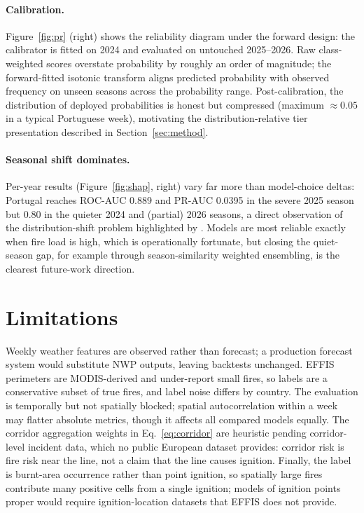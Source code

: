 \documentclass[11pt]{article}
\begin{document}
\paragraph{Calibration.} Figure~\ref{fig:pr} (right) shows the reliability
diagram under the forward design: the calibrator is fitted on 2024 and
evaluated on untouched 2025--2026. Raw class-weighted scores overstate
probability by roughly an order of magnitude; the forward-fitted isotonic
transform aligns predicted probability with observed frequency on unseen
seasons across the probability range. Post-calibration, the
distribution of deployed probabilities is honest but compressed (maximum
$\approx 0.05$ in a typical Portuguese week), motivating the
distribution-relative tier presentation described in
Section~\ref{sec:method}.

\paragraph{Seasonal shift dominates.} Per-year results
(Figure~\ref{fig:shap}, right) vary far more than model-choice deltas:
Portugal reaches ROC-AUC 0.889 and PR-AUC 0.0395 in the severe 2025 season
but 0.80 in the quieter 2024 and (partial) 2026 seasons, a direct
observation of the distribution-shift problem highlighted by
\citet{jiang2026eapo}. Models are most reliable exactly when fire load is
high, which is operationally fortunate, but closing the quiet-season gap,
for example through season-similarity weighted ensembling, is the clearest
future-work direction.

\section{Limitations}
\label{sec:limitations}

Weekly weather features are observed rather than forecast; a production
forecast system would substitute NWP outputs, leaving backtests unchanged.
EFFIS perimeters are MODIS-derived and under-report small fires, so labels
are a conservative subset of true fires, and label noise differs by
country. The evaluation is temporally but not spatially blocked; spatial
autocorrelation within a week may flatter absolute metrics, though it
affects all compared models equally. The corridor aggregation weights in
Eq.~\ref{eq:corridor} are heuristic pending corridor-level incident data,
which no public European dataset provides: corridor risk is fire risk near
the line, not a claim that the line causes ignition. Finally, the label is
burnt-area occurrence rather than point ignition, so spatially large fires
contribute many positive cells from a single ignition; models of ignition
points proper would require ignition-location datasets that EFFIS does not
provide.
\end{document}
